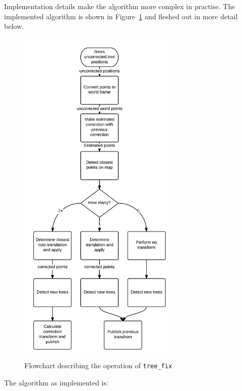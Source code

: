 \documentclass[12pt,oneside,a4paper,draft]{book}
\begin{document}
Implementation details make the algorithm more complex in
practise. The implemented algorithm is shown in
Figure~\ref{fig:tree_fix} and fleshed out in more detail below.
\newpage
\begin{figure}[h!]
  \centering
  \includegraphics[width=0.7\textwidth]{figs/tree_fix}
  \caption{Flowchart describing the operation of \texttt{tree\_fix}}
  \label{fig:tree_fix}
\end{figure}
\newpage
The algorithm as implemented is:
\end{document}

